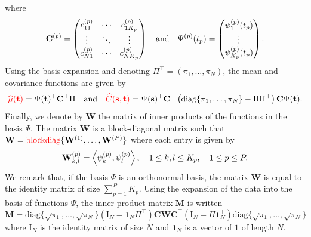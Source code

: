 where
\begin{equation}
\mathbf{C}^{(p)} = \begin{pmatrix}
    c^{(p)}_{11} & \cdots & c^{(p)}_{1K_p} \\
    \vdots & \ddots & \vdots \\
    c^{(p)}_{N1} & \cdots & c^{(p)}_{NK_p}
\end{pmatrix} \\
\quad \text{and}\quad
\Psi^{(p)}(t_p) = \begin{pmatrix}
    \psi_1^{(p)}(t_p) \\
    \vdots \\
    \psi_{K_p}^{(p)}(t_p)
\end{pmatrix}.
\end{equation}
Using the basis expansion and denoting $\Pi^\top = (\pi_1, \dots, \pi_N)$, the mean and covariance functions are given by
\begin{equation}
    \textcolor{red}{\widehat{\mu}(\mathbf{t})} = \Psi(\mathbf{t})^\top \mathbf{C}^\top\Pi \quad\text{and}\quad \textcolor{red}{\widehat{C}(\mathbf{s}, \mathbf{t})} = \Psi(\mathbf{s})^\top \mathbf{C}^\top \left(\text{diag}\{
        \pi_1, \dots, \pi_N\} - \Pi\Pi^\top\right)\mathbf{C} \Psi(\mathbf{t}).
\end{equation}
Finally, we denote by $\mathbf{W}$ the matrix of inner products of the functions in the basis $\Psi$. The matrix $\mathbf{W}$ is a block-diagonal matrix such that $\mathbf{W} = \textcolor{red}{\text{blockdiag}}\{\mathbf{W}^{(1)}, \dots, \mathbf{W}^{(P)}\}$ where each entry is given by
\begin{equation}
    \mathbf{W}_{k, l}^{(p)} = \left\langle\psi_k^{(p)}, \psi_l^{(p)}\right\rangle, \quad 1 \leq k, l \leq K_p, \quad 1 \leq p \leq P.
\end{equation}
We remark that, if the basis $\Psi$ is an orthonormal basis, the matrix $\mathbf{W}$ is equal to the identity matrix of size $\sum_{p = 1}^P K_p$.
Using the expansion of the data into the basis of functions $\Psi$, the inner-product matrix $\mathbf{M}$ is written 
\begin{equation}
    \mathbf{M} = \text{diag}\{
        \sqrt{\pi_1}, \dots, \sqrt{\pi_N}\}\left(\mathrm{I}_{\!N} - \mathbf{1}_{\!N}\Pi^\top\right) \mathbf{C} \mathbf{W} \mathbf{C}^\top \left(\mathrm{I}_{\!N} - \Pi\mathbf{1}_{\!N}^\top\right)\text{diag}\{
        \sqrt{\pi_1}, \dots, \sqrt{\pi_N}\}
\end{equation}
where $\mathrm{I}_{\!N}$ is the identity matrix of size $N$ and $\mathbf{1}_{\!N}$ is a vector of $1$ of length $N$.


